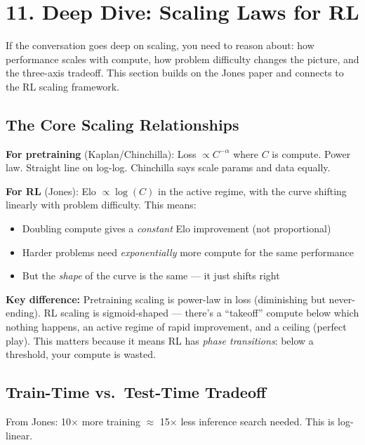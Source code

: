 \section{11. Deep Dive: Scaling Laws for RL}

\begin{bluf}
If the conversation goes deep on scaling, you need to reason about: how performance scales with compute, how problem difficulty changes the picture, and the three-axis tradeoff. This section builds on the Jones paper and connects to the RL scaling framework.
\end{bluf}

\subsection{The Core Scaling Relationships}

\textbf{For pretraining} (Kaplan/Chinchilla): Loss $\propto C^{-\alpha}$ where $C$ is compute. Power law. Straight line on log-log. Chinchilla says scale params and data equally.

\textbf{For RL} (Jones): Elo $\propto \log(C)$ in the active regime, with the curve shifting linearly with problem difficulty. This means:
\begin{itemize}
  \item Doubling compute gives a \textit{constant} Elo improvement (not proportional)
  \item Harder problems need \textit{exponentially} more compute for the same performance
  \item But the \textit{shape} of the curve is the same --- it just shifts right
\end{itemize}

\textbf{Key difference:} Pretraining scaling is power-law in loss (diminishing but never-ending). RL scaling is sigmoid-shaped --- there's a ``takeoff'' compute below which nothing happens, an active regime of rapid improvement, and a ceiling (perfect play). This matters because it means RL has \textit{phase transitions}: below a threshold, your compute is wasted.

\subsection{Train-Time vs.\ Test-Time Tradeoff}

From Jones: 10$\times$ more training $\approx$ 15$\times$ less inference search needed. This is log-linear.


